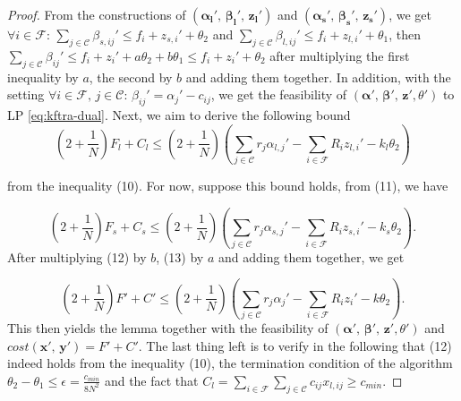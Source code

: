 \documentclass[10pt]{llncs}
\begin{document}
\begin{proof}
From the constructions of $\left(\boldsymbol{\alpha_{l}'},\,\boldsymbol{\beta_{l}'},\,\boldsymbol{z_{l}'}\right)$
and $\left(\boldsymbol{\alpha_{s}'},\,\boldsymbol{\beta_{s}'},\,\boldsymbol{z_{s}'}\right)$,
we get $\forall i\in\mathcal{F}:\,\sum_{j\in\mathcal{C}}\beta_{s,ij}'\leq f_{i}+z_{s,i}'+\theta_{2}$
and $\sum_{j\in\mathcal{C}}\beta_{l,ij}'\leq f_{i}+z_{l,i}'+\theta_{1}$,
then $\sum_{j\in\mathcal{C}}\beta_{ij}'\leq f_{i}+z_{i}'+a\theta_{2}+b\theta_{1}\leq f_{i}+z_{i}'+\theta_{2}$
after multiplying the first inequality by $a$, the second by $b$
and adding them together. In addition, with the setting $\forall i\in\mathcal{F},\, j\in\mathcal{C}:\,\beta_{ij}'=\alpha_{j}'-c_{ij}$,
we get the feasibility of $\left(\boldsymbol{\alpha'},\,\boldsymbol{\beta'},\,\boldsymbol{z'},\theta'\right)$
to LP \eqref{eq:kftra-dual}. Next, we aim to derive the following
bound 
\begin{equation}
\left(2+\frac{1}{N}\right)F_{l}+C_{l}\leq\left(2+\frac{1}{N}\right)\left(\sum_{j\in\mathcal{C}}r_{j}\alpha_{l,j}'-\sum_{i\in\mathcal{F}}R_{i}z_{l,i}'-k_{l}\theta_{2}\right)
\end{equation}
 

from the inequality (10). For now, suppose this bound holds, from
(11), we have

\begin{equation}
\left(2+\frac{1}{N}\right)F_{s}+C_{s}\leq\left(2+\frac{1}{N}\right)\left(\sum_{j\in\mathcal{C}}r_{j}\alpha_{s,j}'-\sum_{i\in\mathcal{F}}R_{i}z_{s,i}'-k_{s}\theta_{2}\right).
\end{equation}
After multiplying (12) by $b$, (13) by $a$ and adding them together,
we get 

\begin{equation}
\left(2+\frac{1}{N}\right)F'+C'\leq\left(2+\frac{1}{N}\right)\left(\sum_{j\in\mathcal{C}}r_{j}\alpha_{j}'-\sum_{i\in\mathcal{F}}R_{i}z_{i}'-k\theta_{2}\right).
\end{equation}
This then yields the lemma together with the feasibility of $\left(\boldsymbol{\alpha'},\,\boldsymbol{\beta'},\,\boldsymbol{z'},\theta'\right)$
and $cost\left(\boldsymbol{x'},\,\boldsymbol{y'}\right)=F'+C'$. The
last thing left is to verify in the following that (12) indeed holds
from the inequality (10), the termination condition of the algorithm
$\theta_{2}-\theta_{1}\leq\epsilon=\frac{c_{min}}{8N^{2}}$ and the
fact that $C_{l}=\sum_{i\in\mathcal{F}}\sum_{j\in\mathcal{C}}c_{ij}x_{l,ij}\geq c_{min}$.


\end{proof}
\end{document}
